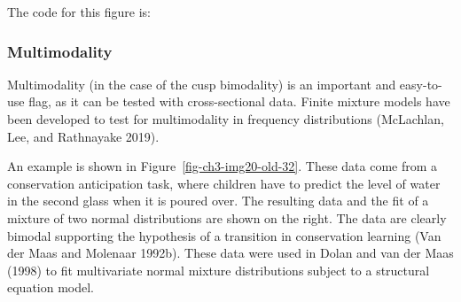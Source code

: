 \documentclass[
  letterpaper,
]{scrbook}
\newenvironment{Shaded}{\begin{snugshade}}{\end{snugshade}}
\newcommand{\AttributeTok}[1]{\textcolor[rgb]{0.40,0.45,0.13}{#1}}
\newcommand{\CommentTok}[1]{\textcolor[rgb]{0.37,0.37,0.37}{#1}}
\newcommand{\DecValTok}[1]{\textcolor[rgb]{0.68,0.00,0.00}{#1}}
\newcommand{\FunctionTok}[1]{\textcolor[rgb]{0.28,0.35,0.67}{#1}}
\newcommand{\NormalTok}[1]{\textcolor[rgb]{0.00,0.23,0.31}{#1}}
\newcommand{\OtherTok}[1]{\textcolor[rgb]{0.00,0.23,0.31}{#1}}
\newcommand{\SpecialCharTok}[1]{\textcolor[rgb]{0.37,0.37,0.37}{#1}}
\newcommand{\StringTok}[1]{\textcolor[rgb]{0.13,0.47,0.30}{#1}}
\begin{document}
The code for this figure is:

\begin{Shaded}
\end{Shaded}

\hypertarget{multimodality}{%
\subsubsection{Multimodality}\label{multimodality}}

Multimodality (in the case of the cusp bimodality) is an important and
easy-to-use flag, as it can be tested with cross-sectional data. Finite
mixture models have been developed to test for multimodality in
frequency distributions (McLachlan, Lee, and Rathnayake 2019).

An example is shown in Figure~\ref{fig-ch3-img20-old-32}. These data
come from a conservation anticipation task, where children have to
predict the level of water in the second glass when it is poured over.
The resulting data and the fit of a mixture of two normal distributions
are shown on the right. The data are clearly bimodal supporting the
hypothesis of a transition in conservation learning (Van der Maas and
Molenaar 1992b). These data were used in Dolan and van der Maas (1998)
to fit multivariate normal mixture distributions subject to a structural
equation model.
\end{document}
